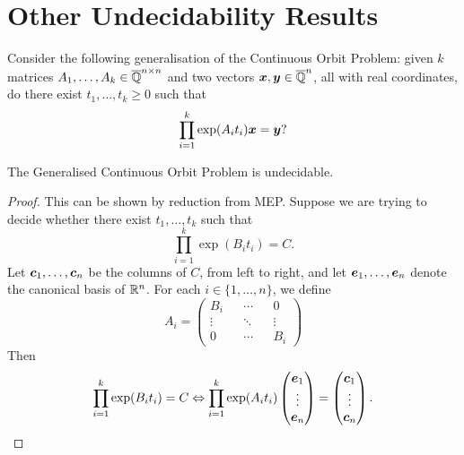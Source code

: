 \section{Other Undecidability Results}

Consider the following generalisation of the Continuous Orbit Problem: given $k$ matrices $A_{1}, \ldots, A_{k} \in \overline{\mathbb{Q}}^{n \times n}$ and two vectors $\boldsymbol{x}, \boldsymbol{y} \in \overline{\mathbb{Q}}^{n}$, all with real coordinates, do there exist $t_{1}, \ldots, t_{k} \geq 0$ such that
\begin{equation}
\prod \limits_{i=1}^{k} \exp(A_{i} t_{i}) \boldsymbol{x} = \boldsymbol{y} ?
\end{equation}

\begin{theorem}
The Generalised Continuous Orbit Problem is undecidable.
\end{theorem}

\begin{proof}
This can be shown by reduction from MEP. Suppose we are trying to decide whether there exist $t_{1}, \ldots, t_{k}$ such that
\begin{equation*}
\prod \limits_{i=1}^{k} \exp(B_{i} t_{i}) = C .
\end{equation*}
Let $\boldsymbol{c}_{1}, \ldots, \boldsymbol{c}_{n}$ be the columns of $C$, from left to right, and let $\boldsymbol{e}_{1}, \ldots, \boldsymbol{e}_{n}$ denote the canonical basis of $\mathbb{R}^{n}$. For each $i \in \lbrace 1, \ldots, n \rbrace$, we define
\begin{equation*}
A_{i} =
\begin{pmatrix}
B_{i} && \cdots && 0 \\
\vdots && \ddots && \vdots \\
0 && \cdots && B_{i}
\end{pmatrix}
\end{equation*}
Then
\begin{equation*}
\prod \limits_{i=1}^{k} \exp(B_{i} t_{i}) = C \Leftrightarrow \prod \limits_{i=1}^{k} \exp(A_{i} t_{i}) \begin{pmatrix} \boldsymbol{e}_{1} \\ \vdots \\ \boldsymbol{e}_{n} \end{pmatrix} = \begin{pmatrix} \boldsymbol{c}_{1} \\ \vdots \\ \boldsymbol{c}_{n} \end{pmatrix} .
\end{equation*}
\end{proof}

